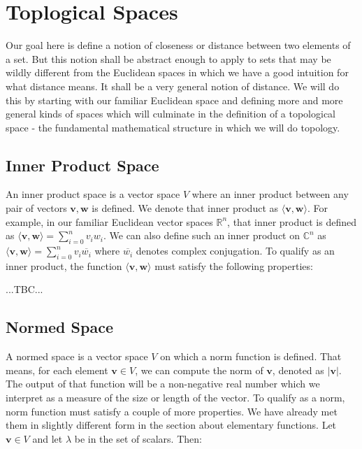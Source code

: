 \section{Toplogical Spaces}
Our goal here is define a notion of closeness or distance between two elements of a set. But this notion shall be abstract enough to apply to sets that may be wildly different from the Euclidean spaces in which we have a good intuition for what distance means. It shall be a very general notion of distance. We will do this by starting with our familiar Euclidean space and defining more and more general kinds of spaces which will culminate in the definition of a topological space - the fundamental mathematical structure in which we will do topology.

\subsection{Inner Product Space}
An inner product space is a vector space $V$ where an inner product between any pair of vectors $\mathbf{v,w}$ is defined. We denote that inner product as $\langle \mathbf{v,w} \rangle$. For example, in our familiar Euclidean vector spaces $\mathbb{R}^n$, that inner product is defined as $\langle \mathbf{v,w} \rangle = \sum_{i=0}^n v_i w_i$. We can also define such an inner product on  $\mathbb{C}^n$ as $\langle \mathbf{v,w} \rangle = \sum_{i=0}^n v_i \overline{w_i}$ where $\overline{w_i}$ denotes complex conjugation. To qualify as an inner product, the function $\langle \mathbf{v,w} \rangle$ must satisfy the following properties:


...TBC...






\subsection{Normed Space}
A normed space is a vector space $V$ on which a norm function is defined. That means, for each element $\mathbf{v} \in V$, we can compute the norm of $\mathbf{v}$, denoted as $|\mathbf{v}|$. The output of that function will be a non-negative real number which we interpret as a measure of the size or length of the vector. To qualify as a norm, norm function must satisfy a couple of more properties. We have already met them in slightly different form in the section about elementary functions. Let $\mathbf{v} \in V$ and let $\lambda$ be in the set of scalars. Then:

